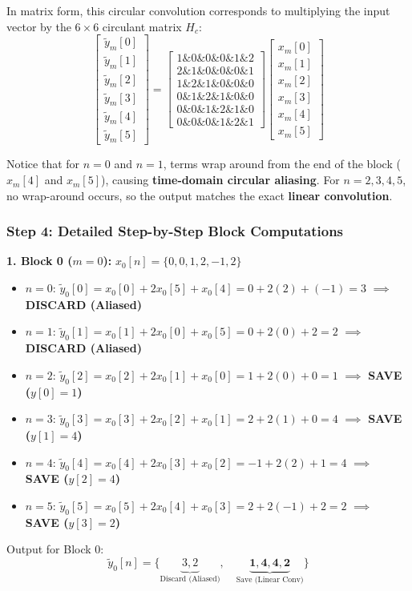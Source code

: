 \documentclass[11pt,a4paper]{article}
\begin{document}
In matrix form, this circular convolution corresponds to multiplying the input vector by the $6 \times 6$ circulant matrix $H_c$:
$$ \begin{bmatrix} \tilde{y}_m[0] \\ \tilde{y}_m[1] \\ \tilde{y}_m[2] \\ \tilde{y}_m[3] \\ \tilde{y}_m[4] \\ \tilde{y}_m[5] \end{bmatrix} = \begin{bmatrix} 1 \& 0 \& 0 \& 0 \& 1 \& 2 \\ 2 \& 1 \& 0 \& 0 \& 0 \& 1 \\ 1 \& 2 \& 1 \& 0 \& 0 \& 0 \\ 0 \& 1 \& 2 \& 1 \& 0 \& 0 \\ 0 \& 0 \& 1 \& 2 \& 1 \& 0 \\ 0 \& 0 \& 0 \& 1 \& 2 \& 1 \end{bmatrix} \begin{bmatrix} x_m[0] \\ x_m[1] \\ x_m[2] \\ x_m[3] \\ x_m[4] \\ x_m[5] \end{bmatrix} $$

Notice that for $n = 0$ and $n = 1$, terms wrap around from the end of the block ($x_m[4]$ and $x_m[5]$), causing \textbf{time-domain circular aliasing}. For $n = 2, 3, 4, 5$, no wrap-around occurs, so the output matches the exact \textbf{linear convolution}.

\subsubsection*{Step 4: Detailed Step-by-Step Block Computations}

\textbf{1. Block 0 ($m = 0$):} $x_0[n] = \{ 0, 0, 1, 2, -1, 2 \}$
\begin{itemize}
\item $n = 0$: $\tilde{y}_0[0] = x_0[0] + 2x_0[5] + x_0[4] = 0 + 2(2) + (-1) = 3$ $\implies$ \textbf{DISCARD (Aliased)}
\item $n = 1$: $\tilde{y}_0[1] = x_0[1] + 2x_0[0] + x_0[5] = 0 + 2(0) + 2 = 2$ $\implies$ \textbf{DISCARD (Aliased)}
\item $n = 2$: $\tilde{y}_0[2] = x_0[2] + 2x_0[1] + x_0[0] = 1 + 2(0) + 0 = 1$ $\implies$ \textbf{SAVE ($y[0] = 1$)}
\item $n = 3$: $\tilde{y}_0[3] = x_0[3] + 2x_0[2] + x_0[1] = 2 + 2(1) + 0 = 4$ $\implies$ \textbf{SAVE ($y[1] = 4$)}
\item $n = 4$: $\tilde{y}_0[4] = x_0[4] + 2x_0[3] + x_0[2] = -1 + 2(2) + 1 = 4$ $\implies$ \textbf{SAVE ($y[2] = 4$)}
\item $n = 5$: $\tilde{y}_0[5] = x_0[5] + 2x_0[4] + x_0[3] = 2 + 2(-1) + 2 = 2$ $\implies$ \textbf{SAVE ($y[3] = 2$)}

\end{itemize}
Output for Block 0:
$$ \tilde{y}_0[n] = \{ \underbrace{3, 2}_{\text{Discard (Aliased)}}, \quad \underbrace{\mathbf{1, 4, 4, 2}}_{\text{Save (Linear Conv)}} \} $$
\end{document}
